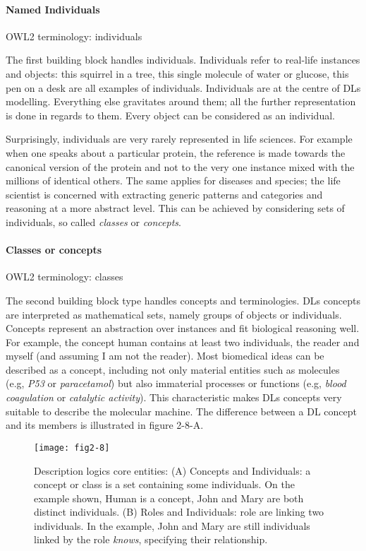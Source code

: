 \paragraph{\textbf{Named Individuals}\\}

OWL2 terminology: individuals

The first building block handles individuals. Individuals refer to real-life instances and objects: this squirrel in a tree, this single molecule of water or glucose, this pen on a desk are all examples of individuals. Individuals are at the centre of DLs modelling. Everything else gravitates around them; all the further representation is done in regards to them. Every object can be considered as an individual.

Surprisingly, individuals are very rarely represented in life sciences. For example when one speaks about a particular protein, the reference is made towards the canonical version of the protein and not to the very one instance mixed with the millions of identical others. The same applies for diseases and species; the life scientist is concerned with extracting generic patterns and categories and reasoning at a more abstract level. This can be achieved by considering sets of individuals, so called \emph{classes} or \emph{concepts}.

\paragraph{\textbf{Classes or concepts}\\}

OWL2 terminology: classes

The second building block type handles concepts and terminologies. DLs concepts are interpreted as mathematical sets, namely groups of objects or individuals. Concepts represent an abstraction over instances and fit biological reasoning well. For example, the concept human contains at least two individuals, the reader and myself (and assuming I am not the reader). Most biomedical ideas can be described as a concept, including not only material entities such as molecules (e.g, \emph{P53} or \emph{paracetamol}) but also immaterial processes or functions (e.g, \emph{blood coagulation} or \emph{catalytic activity}). This characteristic makes DLs concepts very suitable to describe the molecular machine. The difference between a DL concept and its members is illustrated in figure 2-8-A.

\begin{figure}[ht]
    \centering
    \texttt{[image: fig2-8]}
    \caption{Description logics core entities: (A) Concepts and Individuals: a concept or class is a set containing some individuals. On the example shown, Human is a concept, John and Mary are both distinct individuals. (B) Roles and Individuals: role are linking two individuals. In the example, John and Mary are still individuals linked by the role \emph{knows}, specifying their relationship.}
    \label{fig2-8}
\end{figure}

